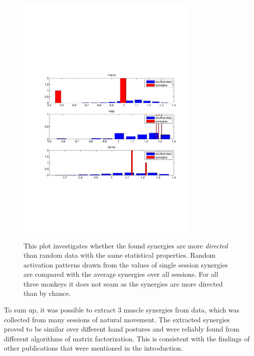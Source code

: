 \begin{figure}[ht]
    \centering
        \includegraphics[width=0.8\textwidth]{images/circ_std_syns.pdf}
    \caption{This plot investigates whether the found synergies are more \emph{directed} than random data with the same statistical properties. Random activation patterns drawn from the values of single session synergies are compared with the average synergies over all sessions. For all three monkeys it does not seam as the synergies are more directed than by chance.}
    \label{sg:fig:images_circ_std_syns}
\end{figure}

To sum up, it was possible to extract 3 muscle synergies from data, which was collected from many sessions of natural movement. The extracted synergies proved to be similar over different hand postures and were reliably found from different algorithms of matrix factorization. This is consistent with the findings of other publications that were mentioned in the introduction.



\clearpage



